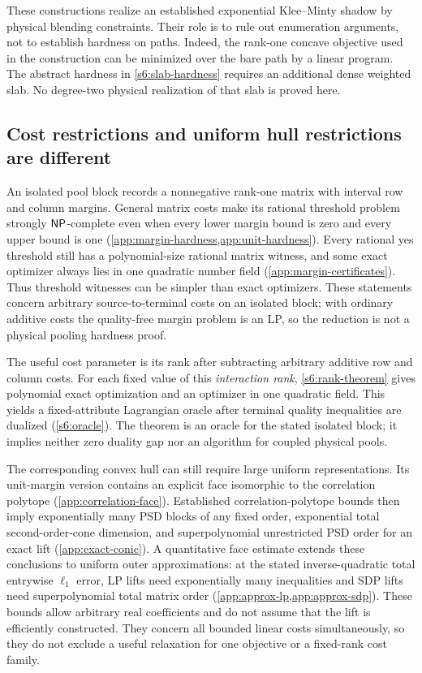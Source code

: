 These constructions realize an established exponential Klee--Minty
shadow \cite{s6:gartner2013} by physical blending constraints. Their role
is to rule out enumeration arguments, not to establish hardness on
paths. Indeed, the rank-one concave objective used in the construction
can be minimized over the bare path by a linear program. The abstract
hardness in \cref{s6:slab-hardness} requires an additional dense weighted
slab. No degree-two physical realization of that slab is proved here.

\subsection{Cost restrictions and uniform hull restrictions are different}
An isolated pool block records a nonnegative rank-one matrix with
interval row and column margins. General matrix costs make its rational
threshold problem strongly $\mathsf{NP}$-complete even when every lower margin
bound is zero and every upper bound is one
(\cref{app:margin-hardness,app:unit-hardness}). Every rational yes threshold
still has a polynomial-size rational matrix witness, and some exact
optimizer always lies in one quadratic number field
(\cref{app:margin-certificates}). Thus threshold witnesses can be simpler
than exact optimizers. These statements concern arbitrary
source-to-terminal costs on an isolated block; with ordinary additive
costs the quality-free margin problem is an LP, so the reduction is not
a physical pooling hardness proof.

The useful cost parameter is its rank after subtracting arbitrary
additive row and column costs. For each fixed value of this
\emph{interaction rank}, \cref{s6:rank-theorem} gives polynomial exact
optimization and an optimizer in one quadratic field. This yields a
fixed-attribute Lagrangian oracle after terminal quality inequalities
are dualized (\cref{s6:oracle}). The theorem is an oracle for the stated
isolated block; it implies neither zero duality gap nor an algorithm
for coupled physical pools.

The corresponding convex hull can still require large uniform
representations. Its unit-margin version contains an explicit face
isomorphic to the correlation polytope (\cref{app:correlation-face}).
Established correlation-polytope bounds then imply exponentially many
PSD blocks of any fixed order, exponential total second-order-cone
dimension, and superpolynomial unrestricted PSD order for an exact lift
(\cref{app:exact-conic}). A quantitative face estimate extends these
conclusions to uniform outer approximations: at the stated
inverse-quadratic total entrywise $\ell_1$ error, LP lifts need exponentially many
inequalities and SDP lifts need superpolynomial total matrix order
(\cref{app:approx-lp,app:approx-sdp}). These bounds allow arbitrary real
coefficients and do not assume that the lift is efficiently constructed.
They concern all bounded linear costs simultaneously, so they do not
exclude a useful relaxation for one objective or a fixed-rank cost family.


